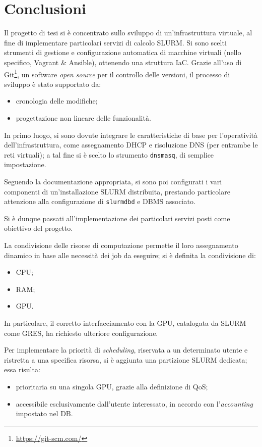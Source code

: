 \documentclass[12pt,a4paper,twoside,openright]{book}
\begin{document}
\chapter{Conclusioni} %
Il progetto di tesi si è concentrato sullo sviluppo di un'infrastruttura virtuale, al fine di implementare particolari servizi di calcolo \ac{SLURM}. Si sono scelti strumenti di gestione e configurazione automatica di macchine virtuali (nello specifico, Vagrant \& Ansible), ottenendo una struttura \acf{IaC}. Grazie all'uso di Git\footnote{\url{https://git-scm.com/}}, un software \textit{open source} per il controllo delle versioni, il processo di sviluppo è stato supportato da:
\begin{itemize}
    \item cronologia delle modifiche;
    \item progettazione non lineare delle funzionalità.
\end{itemize}
In primo luogo, si sono dovute integrare le caratteristiche di base per l'operatività dell'infrastruttura, come assegnamento \ac{DHCP} e risoluzione \ac{DNS} (per entrambe le reti virtuali); a tal fine si è scelto lo strumento \texttt{dnsmasq}, di semplice impostazione.

Seguendo la documentazione appropriata, si sono poi configurati i vari componenti di un'installazione \ac{SLURM} distribuita, prestando particolare attenzione alla configurazione di \texttt{slurmdbd} e \ac{DBMS} associato.

Si è dunque passati all'implementazione dei particolari servizi posti come obiettivo del progetto.

La condivisione delle risorse di computazione permette il loro assegnamento dinamico in base alle necessità dei job da eseguire; si è definita la condivisione di:
\begin{itemize}
    \item \acf{CPU};
    \item \acf{RAM};
    \item \acf{GPU}.
\end{itemize}
In particolare, il corretto interfacciamento con la \ac{GPU}, catalogata da \ac{SLURM} come \acf{GRES}, ha richiesto ulteriore configurazione.

Per implementare la priorità di \textit{scheduling}, riservata a un determinato utente e ristretta a una specifica risorsa, si è aggiunta una partizione \ac{SLURM} dedicata; essa risulta:
\begin{itemize}
    \item prioritaria su una singola \ac{GPU}, grazie alla definizione di \acf{QoS};
    \item accessibile esclusivamente dall'utente interessato, in accordo con l'\textit{accounting} impostato nel \ac{DB}.
\end{itemize}
\end{document}
